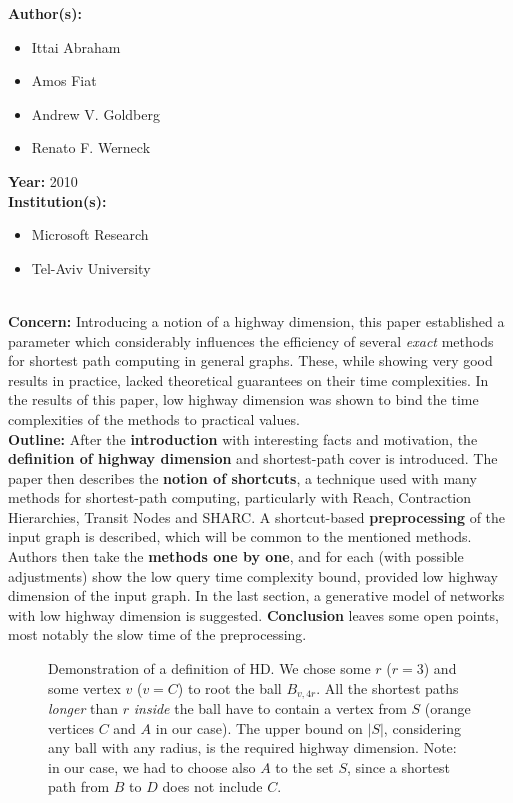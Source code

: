 \documentclass[a4paper]{article}
\newcommand{\inputTikZ}[1]{%
  }
\newcommand{\inputTikZ}[1]{%
    \beginpgfgraphicnamed{#1-external}%
    \endpgfgraphicnamed%
  }
\newenvironment{itemizesp}
{
    \begin{itemize}
}
{
    \end{itemize}
}
\newcommand{\textbff}[1]{{\large \textbf{#1}}}
\begin{document}
        \textbff{Author(s): }
        \begin{itemizesp}
            \item Ittai Abraham
            \item Amos Fiat
            \item Andrew V. Goldberg
            \item Renato F. Werneck
        \end{itemizesp}
        \textbff{Year: }2010\\
        \textbff{Institution(s): }
        \begin{itemizesp}
            \item Microsoft Research
            \item Tel-Aviv University
        \end{itemizesp}
        {\hfill}\\
        \textbff{Concern:} Introducing a notion of a highway dimension, this paper established a parameter which considerably influences the efficiency of several \emph{exact} methods for shortest path computing in general graphs. These, while showing very good results in practice, lacked theoretical guarantees on their time complexities. In the results of this paper, low highway dimension was shown to bind the time complexities of the methods to practical values. \\

        \textbff{Outline:} After the \textbf{introduction} with interesting facts and motivation, the \textbf{definition of highway dimension} and shortest-path cover is introduced. The paper then describes the \textbf{notion of shortcuts}, a technique used with many methods for shortest-path computing, particularly with Reach, Contraction Hierarchies, Transit Nodes and SHARC. A shortcut-based \textbf{preprocessing} of the input graph is described, which will be common to the mentioned methods. Authors then take the \textbf{methods one by one}, and for each (with possible adjustments) show the low query time complexity bound, provided low highway dimension of the input graph. In the last section, a generative model of networks with low highway dimension is suggested. \textbf{Conclusion} leaves some open points, most notably the slow time of the preprocessing. \\

        \begin{figure}[h]
            \scriptsize
            \begin{center}
                \inputTikZ{./tikzpics/highwaydim}
            \end{center}
            \caption{\label{fig:highwaydim} Demonstration of a definition of HD. We chose some $r$ ($r = 3$) and some vertex $v$ ($v = C$) to root the ball $B_{v, 4r}$. All the shortest paths \emph{longer} than $r$ \emph{inside} the ball have to contain a vertex from $S$ (orange vertices $C$ and $A$ in our case). The upper bound on $|S|$, considering any ball with any radius, is the required highway dimension. Note: in our case, we had to choose also $A$ to the set $S$, since a shortest path from $B$ to $D$ does not include $C$.}
        \end{figure}
\end{document}
